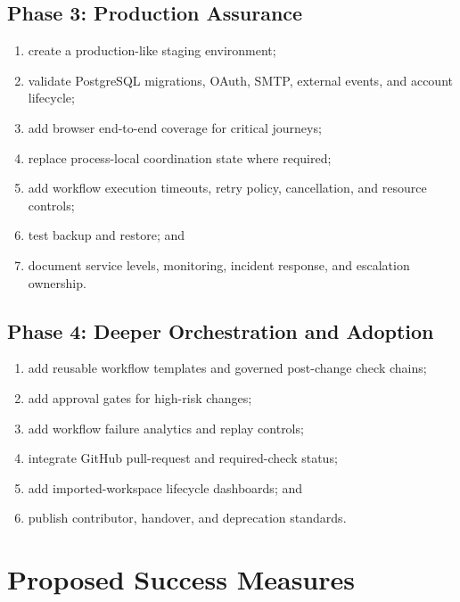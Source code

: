 \documentclass[12pt]{report}
\begin{document}
\subsection{Phase 3: Production Assurance}

\begin{enumerate}
  \item create a production-like staging environment;
  \item validate PostgreSQL migrations, OAuth, SMTP, external events, and account lifecycle;
  \item add browser end-to-end coverage for critical journeys;
  \item replace process-local coordination state where required;
  \item add workflow execution timeouts, retry policy, cancellation, and resource controls;
  \item test backup and restore; and
  \item document service levels, monitoring, incident response, and escalation ownership.
\end{enumerate}

\subsection{Phase 4: Deeper Orchestration and Adoption}

\begin{enumerate}
  \item add reusable workflow templates and governed post-change check chains;
  \item add approval gates for high-risk changes;
  \item add workflow failure analytics and replay controls;
  \item integrate GitHub pull-request and required-check status;
  \item add imported-workspace lifecycle dashboards; and
  \item publish contributor, handover, and deprecation standards.
\end{enumerate}

\section{Proposed Success Measures}
\end{document}
